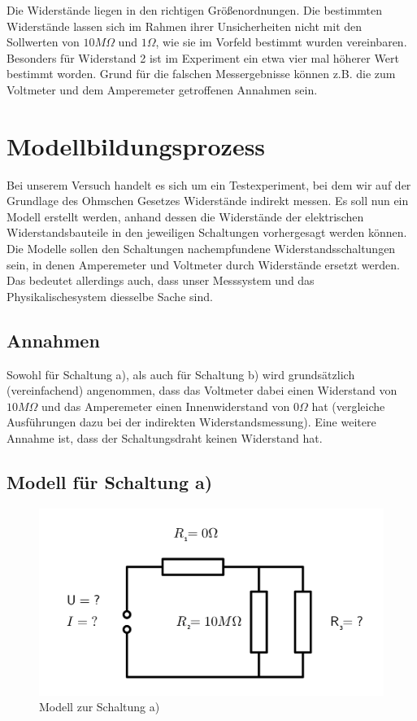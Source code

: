 \documentclass[
  9pt,
]{article}
\begin{document}
Die Widerstände liegen in den richtigen Größenordnungen. Die bestimmten
Widerstände lassen sich im Rahmen ihrer Unsicherheiten nicht mit den
Sollwerten von \(10M\Omega\) und \(1\Omega\), wie sie im Vorfeld
bestimmt wurden vereinbaren. Besonders für Widerstand 2 ist im
Experiment ein etwa vier mal höherer Wert bestimmt worden. Grund für die
falschen Messergebnisse können z.B. die zum Voltmeter und dem
Amperemeter getroffenen Annahmen sein.

\hypertarget{modellbildungsprozess}{%
\section{Modellbildungsprozess}\label{modellbildungsprozess}}

Bei unserem Versuch handelt es sich um ein Testexperiment, bei dem wir
auf der Grundlage des Ohmschen Gesetzes Widerstände indirekt messen. Es
soll nun ein Modell erstellt werden, anhand dessen die Widerstände der
elektrischen Widerstandsbauteile in den jeweiligen Schaltungen
vorhergesagt werden können. Die Modelle sollen den Schaltungen
nachempfundene Widerstandsschaltungen sein, in denen Amperemeter und
Voltmeter durch Widerstände ersetzt werden. Das bedeutet allerdings
auch, dass unser Messsystem und das Physikalischesystem diesselbe Sache
sind.

\hypertarget{annahmen}{%
\subsection{Annahmen}\label{annahmen}}

Sowohl für Schaltung a), als auch für Schaltung b) wird grundsätzlich
(vereinfachend) angenommen, dass das Voltmeter dabei einen Widerstand
von \(10M\Omega\) und das Amperemeter einen Innenwiderstand von
\(0\Omega\) hat (vergleiche Ausführungen dazu bei der indirekten
Widerstandsmessung). Eine weitere Annahme ist, dass der Schaltungsdraht
keinen Widerstand hat.

\hypertarget{modell-fuxfcr-schaltung-a}{%
\subsection{Modell für Schaltung a)}\label{modell-fuxfcr-schaltung-a}}

\begin{figure}
\centering
\includegraphics[width=\textwidth,height=0.2\textheight]{Bilder/ModellA.png}
\caption{Modell zur Schaltung a)}
\end{figure}
\end{document}
